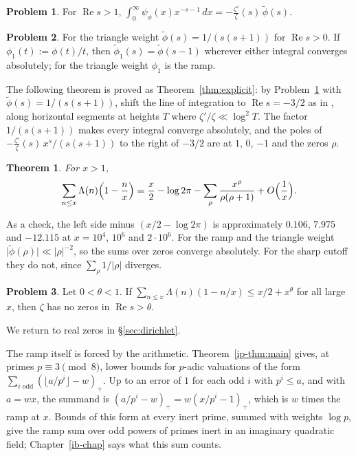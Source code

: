 \documentclass[reqno]{amsart}
\newcounter{chap}
\theoremstyle{definition}
\newtheorem{problem}{Problem}[section]
\theoremstyle{plain}
\newtheorem{theorem}{Theorem}[section]
\renewcommand{\Re}{\operatorname{Re}}
\begin{document}
\begin{problem}\label{pr:smooth-mellin}
For $\Re s > 1$, $\int_0^\infty \psi_\phi(x) x^{-s-1} \, d x = -\frac{\zeta'}{\zeta}(s) \, \tilde\phi(s)$.
\end{problem}

\begin{problem}\label{pr:triangle-mellin}
For the triangle weight $\tilde\phi(s) = 1/(s(s+1))$ for $\Re s > 0$.  If $\phi_1(t) := \phi(t)/t$, then $\tilde\phi_1(s) = \tilde\phi(s - 1)$ wherever either integral converges absolutely; for the triangle weight $\phi_1$ is the ramp.
\end{problem}

The following theorem is proved as Theorem~\ref{thm:explicit}: by Problem~\ref{pr:smooth-mellin} with $\tilde\phi(s) = 1/(s(s+1))$, shift the line of integration to $\Re s = -3/2$ as in \cite[Ch.~17]{Dav}, along horizontal segments at heights $T$ where $\zeta'/\zeta \ll \log^2 T$.  The factor $1/(s(s+1))$ makes every integral converge absolutely, and the poles of $-\frac{\zeta'}{\zeta}(s)\, x^s/(s(s+1))$ to the right of $-3/2$ are at $1$, $0$, $-1$ and the zeros $\rho$.

\begin{theorem}\label{thm:triangle}
For $x > 1$,
\[
  \sum_{n \le x} \Lambda(n) \Bigl(1 - \frac{n}{x}\Bigr) = \frac{x}{2} - \log 2\pi - \sum_\rho \frac{x^\rho}{\rho(\rho + 1)} + O\Bigl(\frac1x\Bigr) .
\]
\end{theorem}

As a check, the left side minus $(x/2 - \log 2\pi)$ is approximately $0.106$, $7.975$ and $-12.115$ at $x = 10^4$, $10^6$ and $2 \cdot 10^6$.  For the ramp and the triangle weight $\lvert \tilde\phi(\rho) \rvert \ll \lvert \rho \rvert^{-2}$, so the sums over zeros converge absolutely.  For the sharp cutoff they do not, since $\sum_\rho 1/\lvert \rho \rvert$ diverges.

\begin{problem}\label{pr:triangle-one-sided}
Let $0 < \theta < 1$.  If $\sum_{n \le x} \Lambda(n)(1 - n/x) \le x/2 + x^\theta$ for all large $x$, then $\zeta$ has no zeros in $\Re s > \theta$.
\end{problem}

We return to real zeros in \S\ref{sec:dirichlet}.

The ramp itself is forced by the arithmetic.  Theorem~\ref{ip-thm:main} gives, at primes $p \equiv 3 \pmod 8$, lower bounds for $p$-adic valuations of the form $\sum_{i \text{ odd}} (\lfloor a/p^i \rfloor - w)_+$.  Up to an error of $1$ for each odd $i$ with $p^i \le a$, and with $a = wx$, the summand is $(a/p^i - w)_+ = w(x/p^i - 1)_+$, which is $w$ times the ramp at $x$.  Bounds of this form at every inert prime, summed with weights $\log p$, give the ramp sum over odd powers of primes inert in an imaginary quadratic field; Chapter~\ref{ib-chap} says what this sum counts.
\end{document}
